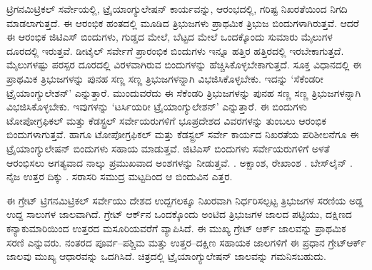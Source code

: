 ಟ್ರಿಗನಮಿಟ್ರಿಕಲ್​ ಸರ್ವೇಯಲ್ಲಿ, ಟ್ರೈಯಾಂಗ್ಯುಲೇಷನ್​ ಕಾರ್ಯವನ್ನು, ಆರಂಭದಲ್ಲಿ, ಗರಿಷ್ಟ ನಿಖರತೆಯಿಂದ ನಿಗದಿ ಮಾಡಲಾಗುತ್ತದೆ. ಈ ಆರಂಭಿಕ ಹಂತದಲ್ಲಿ ಮೂಡಿದ ತ್ರಿಭುಜಗಳು ಪ್ರಾಥಮಿಕ ತ್ರಿಭುಜ ಬಿಂದುಗಳಾಗಿರುತ್ತವೆ. ಆದರೆ ಈ ಆರಂಭಿಕ ಜಿಟಿಎಸ್​ ಬಿಂದುಗಳು, ಗುಡ್ಡದ ಮೇಲೆ, ಬೆಟ್ಟದ ಮೇಲೆ ಒಂದಕ್ಕೊಂದು ಸುಮಾರು  ಮೈಲುಗಳ ದೂರದಲ್ಲಿ ಇರುತ್ತವೆ. ಡೀಟೈಲ್​ ಸರ್ವೇಗೆ ಪ್ರಾರಂಭಿಕ ಬಿಂದುಗಳು ಇನ್ನೂ ಹತ್ತಿರ ಹತ್ತಿರದಲ್ಲಿ ಇರಬೇಕಾಗುತ್ತದೆ.  ಮೈಲುಗಳಷ್ಟು ಪರಸ್ಪರ ದೂರದಲ್ಲಿ ವಿರಳವಾಗಿರುವ ಬಿಂದುಗಳನ್ನು ಹೆಚ್ಚಿಸಿಕೊಳ್ಳಬೇಕಾಗುತ್ತದೆ. ಸೂಕ್ತ ವಿಧಾನದಲ್ಲಿ ಈ ಪ್ರಾಥಮಿಕ ತ್ರಿಭುಜಗಳನ್ನು ಪುನಹ ಸಣ್ಣ ಸಣ್ಣ ತ್ರಿಭುಜಗಳನ್ನಾಗಿ ವಿಭಜಿಸಿಕೊಳ್ಳಬೇಕು. ಇದನ್ನು ‘ಸೆಕೆಂಡರೀ ಟ್ರೈಯಾಂಗ್ಯುಲೇಶನ್​’ ಎನ್ನುತ್ತಾರೆ. ಮುಂದುವರೆದು ಈ ಸೆಕೆಂಡರಿ ತ್ರಿಭುಜಗಳನ್ನು ಪುನಹ ಸಣ್ಣ ಸಣ್ಣ ತ್ರಿಭುಜಗಳನ್ನಾಗಿ ವಿಭಜಿಸಿಕೊಳ್ಳಬೇಕು. ಇವುಗಳನ್ನು ‘ಟರ್ಸಿಯರೀ ಟ್ರೈಯಾಂಗ್ಯುಲೇಶನ್​’ ಎನ್ನುತ್ತಾರೆ. ಈ ಬಿಂದುಗಳು ಟೋಪೋಗ್ರಫಿಕಲ್​ ಮತ್ತು ಕೆಡಸ್ಟ್ರಲ್​ ಸರ್ವೇಯರುಗಳಿಗೆ ಭೂಪ್ರದೇಶದ ವಿವರಗಳನ್ನು ತುಂಬಲು ಆರಂಭಿಕ ಬಿಂದುಗಳಾಗುತ್ತವೆ. ಹಾಗೂ ಟೋಪೋಗ್ರಫಿಕಲ್​ ಮತ್ತು ಕೆಡಸ್ಟ್ರಲ್​ ಸರ್ವೇ ಕಾರ್ಯದ ನಿಖರತೆಯ ಪರಿಶೀಲನೆಗೂ ಈ ಟ್ರೈಯಾಂಗ್ಯುಲೇಷನ್​ ಬಿಂದುಗಳು ಸಹಾಯ ಮಾಡುತ್ತವೆ. ಜಿಟಿಎಸ್​ ಬಿಂದುಗಳು ಸರ್ವೇಯರುಗಳಿಗೆ ಅಳತೆ ಆರಂಭಿಸಲು ಅಗತ್ಯವಾದ ನಾಲ್ಕು ಪ್ರಮುಖವಾದ ಅಂಶಗಳನ್ನು ನೀಡುತ್ತವೆ. . ಅಕ್ಷಾಂಶ, ರೇಖಾಂಶ . ಬೇಸ್‌ಲೈನ್​ . ನೈಜ ಉತ್ತರ ದಿಕ್ಕು . ಸರಾಸರಿ ಸಮುದ್ರ ಮಟ್ಟದಿಂದ ಆ ಬಿಂದುವಿನ ಎತ್ತರ.

ಈ ಗ್ರೇಟ್​ ಟ್ರಿಗನಮಿಟ್ರಿಕಲ್​ ಸರ್ವೇಯು ದೇಶದ ಉದ್ದಗಲಕ್ಕೂ ನಿಖರವಾಗಿ ನಿರ್ಧರಿಸಲ್ಪಟ್ಟ ತ್ರಿಭುಜಗಳ ಸರಣಿಯ ಅಡ್ಡ ಉದ್ದ ಸಾಲುಗಳ ಜಾಲವಾಗಿದೆ. ಗ್ರೇಟ್​ ಆರ್ಕ್‌ನ ಒಂದಕ್ಕೊಂದು ಅಂಟಿದ ತ್ರಿಭುಜಗಳ ಜಾಲದ ಪಟ್ಟಿಯು, ದಕ್ಷಿಣದ ಕನ್ಯಾಕುಮಾರಿಯಿಂದ ಉತ್ತರದ ಮಸೂರಿಯವರೆಗೆ ವ್ಯಾಪಿಸಿದೆ. ಈ ಮುಖ್ಯ ಗ್ರೇಟ್​ ಆರ್ಕ್ ಜಾಲವನ್ನು ಪ್ರಾಥಮಿಕ ಸರಣಿ ಎನ್ನುವರು. ನಂತರದ ಪೂರ್ವ–ಪಶ್ಚಿಮ ಮತ್ತು ಉತ್ತರ–ದಕ್ಷಿಣ ಸಹಾಯಕ ಜಾಲಗಳಿಗೆ ಈ ಪ್ರಧಾನ ಗ್ರೇಟ್​ ಆರ್ಕ್ ಜಾಲವು ಮುಖ್ಯ ಆಧಾರವನ್ನು ಒದಗಿಸಿದೆ. ಚಿತ್ರದಲ್ಲಿ ಟ್ರೈಯಾಂಗ್ಯುಲೇಷನ್​ ಜಾಲವನ್ನು ಗಮನಿಸಬಹುದು.

